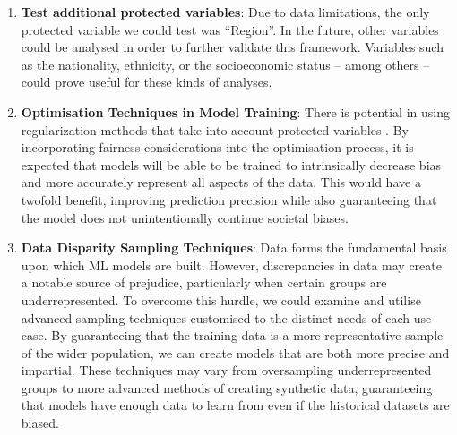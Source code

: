 \documentclass[twoside,11pt]{article}
\begin{document}
\begin{enumerate}
    \item \textbf{Test additional protected variables}: Due to data limitations, the only protected variable we could test was ``Region''. In the future, other variables could be analysed in order to further validate this framework. Variables such as the nationality, ethnicity, or the socioeconomic status -- among others -- could prove useful for these kinds of analyses. 
    \item \textbf{Optimisation Techniques in Model Training}: There is potential in using regularization methods that take into account protected variables . By incorporating fairness considerations into the optimisation process, it is expected that models will be able to be trained to intrinsically decrease bias and more accurately represent all aspects of the data. This would have a twofold benefit, improving prediction precision while also guaranteeing that the model does not unintentionally continue societal biases.

    \item \textbf{Data Disparity Sampling Techniques}: Data forms the fundamental basis upon which ML models are built. However, discrepancies in data may create a notable source of prejudice, particularly when certain groups are underrepresented. To overcome this hurdle, we could examine and utilise advanced sampling techniques customised to the distinct needs of each use case. By guaranteeing that the training data is a more representative sample of the wider population, we can create models that are both more precise and impartial. These techniques may vary from oversampling underrepresented groups to more advanced methods of creating synthetic data, guaranteeing that models have enough data to learn from even if the historical datasets are biased.
    
\end{enumerate}


\end{document}
